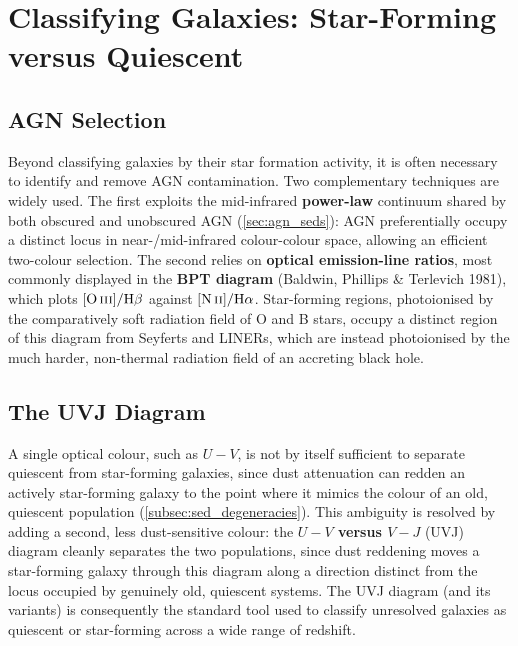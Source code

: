 \section{Classifying Galaxies: Star-Forming versus Quiescent} \label{sec:galaxy_classification}

\subsection{AGN Selection} \label{subsec:agn_selection_lines}

Beyond classifying galaxies by their star formation activity, it is often necessary to identify and remove AGN contamination. Two complementary techniques are widely used. The first exploits the mid-infrared \textbf{power-law} continuum shared by both obscured and unobscured AGN (\cref{sec:agn_seds}): AGN preferentially occupy a distinct locus in near-/mid-infrared colour-colour space, allowing an efficient two-colour selection. The second relies on \textbf{optical emission-line ratios}, most commonly displayed in the \textbf{BPT diagram} (Baldwin, Phillips \& Terlevich 1981), which plots $[\text{O\,\textsc{iii}}]/\text{H}\beta$ against $[\text{N\,\textsc{ii}}]/\text{H}\alpha$. Star-forming regions, photoionised by the comparatively soft radiation field of O and B stars, occupy a distinct region of this diagram from Seyferts and LINERs, which are instead photoionised by the much harder, non-thermal radiation field of an accreting black hole.

\subsection{The UVJ Diagram} \label{subsec:uvj_diagram}

A single optical colour, such as $U-V$, is not by itself sufficient to separate quiescent from star-forming galaxies, since dust attenuation can redden an actively star-forming galaxy to the point where it mimics the colour of an old, quiescent population (\cref{subsec:sed_degeneracies}). This ambiguity is resolved by adding a second, less dust-sensitive colour: the \textbf{$U-V$ versus $V-J$} (UVJ) diagram cleanly separates the two populations, since dust reddening moves a star-forming galaxy through this diagram along a direction distinct from the locus occupied by genuinely old, quiescent systems. The UVJ diagram (and its variants) is consequently the standard tool used to classify unresolved galaxies as quiescent or star-forming across a wide range of redshift.

